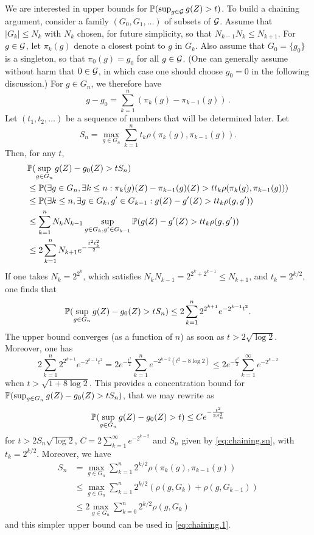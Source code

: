 We are interested in upper bounds for $\bm{\mathbb P}(\sup_{g\in{\mathcal G}} g(Z) > t)$. To build a chaining argument, consider a family $(G_0, G_1, \ldots)$ of subsets  of ${\mathcal G}$. Assume that  $|G_k| \leq N_k$ with  $N_k$ chosen, for future simplicity, so that $N_{k-1}N_k \leq N_{k+1}$. For $g\in {\mathcal G}$, let $\pi_k(g)$ denote a closest point to $g$ in $G_k$. Also assume that $G_0 = \{g_0\}$ is a singleton, so that $\pi_0(g)= g_0$ for all $g\in{\mathcal G}$. (One can generally assume without harm that $0\in{\mathcal G}$, in which case one should choose $g_0=0$ in the following discussion.)
For $g\in G_n$, we therefore have
\[
g - g_0 = \sum_{k=1}^n (\pi_k(g) - \pi_{k-1}(g))\,.
\]
Let $(t_1, t_2, \ldots)$ be a sequence of numbers that will be determined later. Let
\begin{equation}
\label{eq:chaining.sn}
S_n = \max_{g\in G_n} \sum_{k=1}^n t_k \rho(\pi_k(g), \pi_{k-1}(g)).
\end{equation}
Then, for any $t$, 
\begin{align*}
&\bm{\mathbb P}(\sup_{g\in G_n} g(Z) - g_0(Z) > tS_n) \\
& \leq \bm{\mathbb P}(\exists g \in G_n, \exists k \leq n:   \pi_k(g)(Z) - \pi_{k-1}(g)(Z) >  tt_k \rho(\pi_k(g), \pi_{k-1}(g)))\\
&\leq \bm{\mathbb P}(\exists k \leq n,  \exists g\in G_k, g'\in G_{k-1}:  g(Z) - g'(Z) >  tt_k \rho(g, g'))\\
&\leq \sum_{k=1}^n N_k N_{k-1} \sup_{g\in G_k, g'\in G_{k-1}} \bm{\mathbb P}(g(Z) - g'(Z) >  tt_k \rho(g, g'))\\
&\leq 2\sum_{k=1}^n N_{k+1} e^{-\frac{t^2t_k^2}2}
\end{align*}
If one takes $N_k = 2^{2^k}$, which satisfies $N_kN_{k-1} = 2^{2^k + 2^{k-1}} \leq N_{k+1}$, and $t_k = 2^{k/2}$, one finds that
\[
\bm{\mathbb P}(\sup_{g\in G_n} g(Z) - g_0(Z) > tS_n) \leq 2 \sum_{k=1}^n 2^{2^{k+1}} e^{-{2^{k-1} t^2}}.
\]
The upper bound converges (as a function of $n$) as soon as $t > 2 \sqrt{\log 2}$. Moreover, one has
\[
2 \sum_{k=1}^n 2^{2^{k+1}} e^{-{2^{k-1} t^2}} = 2e^{-\frac{t^2}2} \sum_{k=1}^n e^{-2^{k-2} (t^2-8\log2)} \leq 2e^{-\frac{t^2}2}\sum_{k=1}^\infty e^{-2^{k-2}}
\]
when $t > \sqrt{1 + 8\log 2}$. This provides a concentration bound for $\bm{\mathbb P}(\sup_{g\in G_n} g(Z) - g_0(Z) > tS_n)$, that we may rewrite as
\begin{equation}
\label{eq:chaining.1}
\bm{\mathbb P}(\sup_{g\in G_n} g(Z) - g_0(Z) > t) \leq C e^{-\frac{t^2}{2S_n^2}}
\end{equation}
for $t> 2 S_n\sqrt{\log 2}$, $C = 2 \sum_{k=1}^\infty e^{-2^{k-2}}$ and $S_n$ given by \cref{eq:chaining.sn}, with $t_k = 2^{k/2}$. Moreover, we have 
\begin{align*}
S_n &= \max_{g\in G_n} \sum_{k=1}^n 2^{k/2} \rho(\pi_k(g), \pi_{k-1}(g))\\
&\leq  \max_{g\in G_n} \sum_{k=1}^n 2^{k/2} (\rho(g, G_k) + \rho(g, G_{k-1})) \\
&\leq  2 \max_{g\in G_n} \sum_{k=0}^n 2^{k/2} \rho(g, G_k)
\end{align*} 
and this simpler upper bound can be used in \cref{eq:chaining.1}. 

